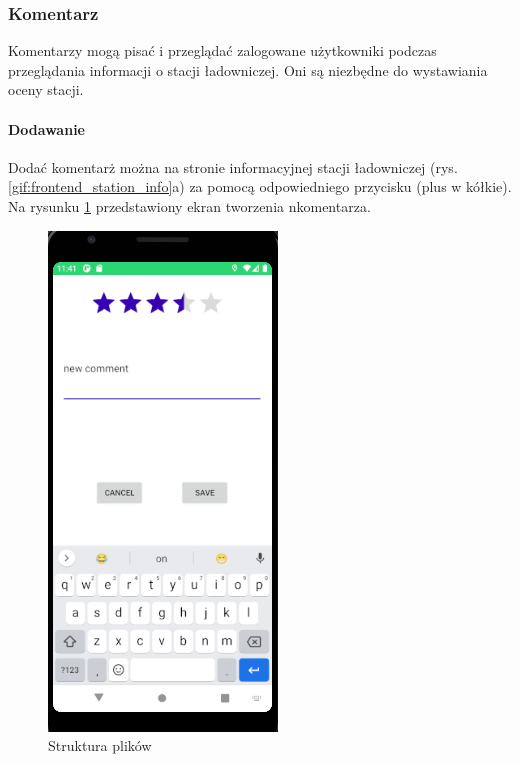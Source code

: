\subsubsection{Komentarz}
Komentarzy mogą pisać i przeglądać zalogowane użytkowniki podczas przeglądania informacji o stacji ładowniczej. Oni są niezbędne do wystawiania oceny stacji.
\paragraph{Dodawanie\newline}
Dodać komentarż można na stronie informacyjnej stacji ładowniczej (rys. \ref{gif:frontend_station_info}a) za pomocą odpowiedniego przycisku (plus w kółkie). Na rysunku \ref{fig:front_comment_create} przedstawiony ekran tworzenia nkomentarza.
\begin{figure}[ht]
    \centering
    \includegraphics[width=0.25\linewidth]{rys03/front_comment_create.png}
    \caption{Struktura plików}
    \label{fig:front_comment_create}
\end{figure}

